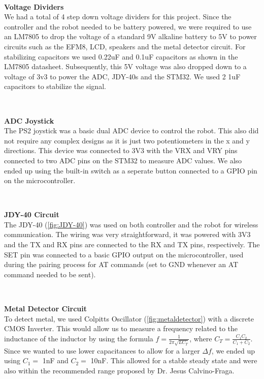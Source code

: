 \documentclass{article}
\begin{document}
\

\textbf{Voltage Dividers} \\
We had a total of 4 step down voltage dividers for this project. Since the controller and the robot needed to be battery powered, we were required to use an LM7805 to drop the voltage of a standard 9V alkaline battery to 5V to power circuits such as the EFM8, LCD, speakers and the metal detector circuit. For stabilizing capacitors we used 0.22uF and 0.1uF capacitors as shown in the LM7805 datasheet. Subsequently, this 5V voltage was also dropped down to a voltage of 3v3 to power the ADC, JDY-40s and the STM32. We used 2 1uF capacitors to stabilize the signal.

\

\textbf{ADC Joystick} \\
The PS2 joystick was a basic dual ADC device to control the robot. This also did not require any complex designs as it is just two potentiometers in the x and y directions. This device was connected to 3V3 with the VRX and VRY pins connected to two ADC pins on the STM32 to measure ADC values. We also ended up using the built-in switch as a seperate button connected to a GPIO pin on the microcontroller.

\

\textbf{JDY-40 Circuit} \\
The JDY-40 (\ref{fig:JDY-40}) was used on both controller and the robot for wireless communication. The wiring was very straightforward, it was powered with 3V3 and the TX and RX pins are connected to the RX and TX pins, respectively. The SET pin was connected to a basic GPIO output on the microcontroller, used during the pairing process for AT commands (set to GND whenever an AT command needed to be sent).

\

\textbf{Metal Detector Circuit} \\
To detect metal, we used Colpitts Oscillator (\ref{fig:metaldetector}) with a discrete CMOS Inverter. This would allow us to measure a frequency related to the inductance of the inductor by using the formula $f = \frac{1}{2 \pi \sqrt{LC_T}}$, where $C_T = \frac{C_1C_2}{C_1+C_2}$. Since we wanted to use lower capacitances to allow for a larger $\Delta f$, we ended up using $C_1 =$ 1nF and $C_2 =$ 10nF. This allowed for a stable steady state and were also within the recommended range proposed by Dr. Jesus Calvino-Fraga.

\
\end{document}
